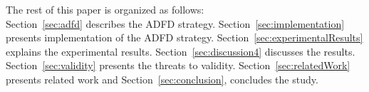 The rest of this paper is organized as follows: \\ Section~\ref{sec:adfd} describes the ADFD strategy. Section~\ref{sec:implementation} presents implementation of the ADFD strategy. Section~\ref{sec:experimentalResults} explains the experimental results. Section~\ref{sec:discussion4} discusses the results. Section~\ref{sec:validity} presents the threats to validity. Section~\ref{sec:relatedWork} presents related work and Section~\ref{sec:conclusion}, concludes the study.




